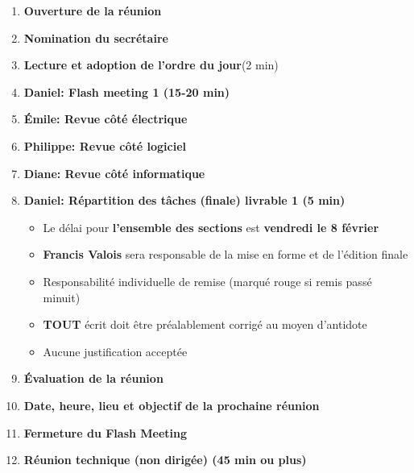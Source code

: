 \documentclass[12pt]{ULojpv}
\begin{document}
\entete
\begin{enumerate}
   \item \textbf{Ouverture de la réunion}
   \item \textbf{Nomination du secrétaire}
   \item \textbf{Lecture et adoption de l'ordre du jour}(2 min)
   \item \textbf{Daniel: Flash meeting 1 (15-20 min)} 
   \item \textbf{Émile: Revue côté électrique}
   \item \textbf{Philippe: Revue côté logiciel}
   \item \textbf{Diane: Revue côté informatique}
   \item \textbf{Daniel: Répartition des tâches (finale) livrable 1 (5 min)}
   \begin{itemize}
   \item Le délai pour \textbf{l'ensemble des sections} est \textbf{vendredi le 8 février}
   \item \textbf{Francis Valois} sera responsable de la mise en forme et  de l'édition finale
   \item Responsabilité individuelle de remise (marqué rouge si remis passé minuit)
   \item \textbf{TOUT} écrit doit être préalablement corrigé au moyen d'antidote
   \item Aucune  justification acceptée
   \end{itemize}
   \item \textbf{Évaluation de la réunion}
   \item \textbf{Date, heure, lieu et objectif de la prochaine réunion}
   \item \textbf{Fermeture du Flash Meeting}
   \item \textbf{Réunion technique (non dirigée) (45 min ou plus)}
\end{enumerate}
\end{document}
